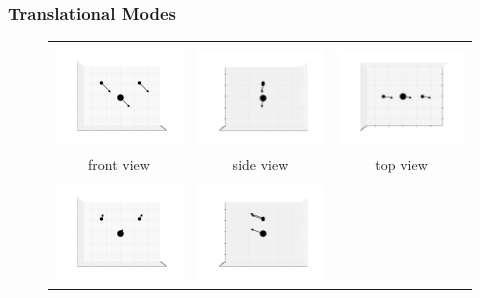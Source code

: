 \documentclass[11pt]{article}
\begin{document}
\subsubsection{Translational Modes}
\label{trans}
\begin{figure}[htp]
	\centering
	\begin{tabular}{|ccc|}\hline&&\\
	\includegraphics[width=5.5cm,clip=true,trim=3cm 2cm 3cm 2cm]{0-0_0.pdf}&
	\includegraphics[width=5.5cm,clip=true,trim=3cm 2cm 3cm 2cm]{0-90_0.pdf}&
	\includegraphics[width=5.5cm,clip=true,trim=3cm 2cm 3cm 2cm]{90-0_0.pdf}\\front view&side view&top view\\\hline&&\\
	\includegraphics[width=5.5cm,clip=true,trim=3cm 2cm 3cm 2cm]{0-0_1.pdf}&
	\includegraphics[width=5.5cm,clip=true,trim=3cm 2cm 3cm 2cm]{0-90_1.pdf}&

\end{tabular}
\end{figure}
\end{document}
